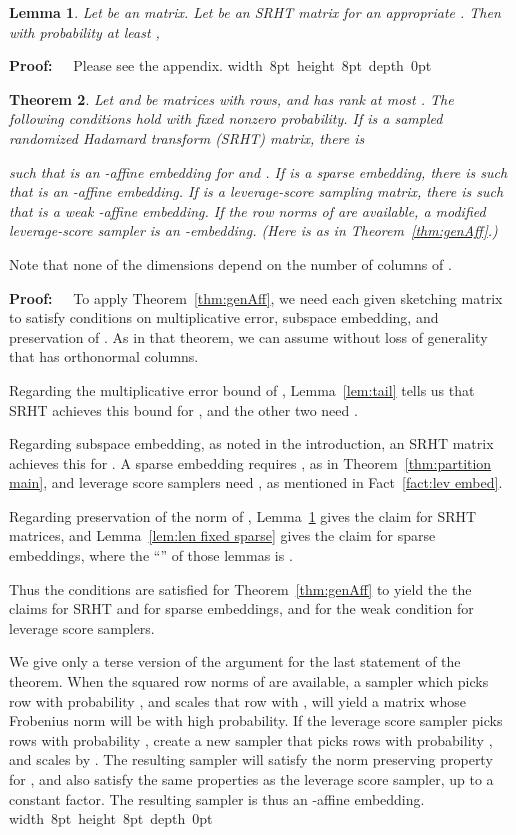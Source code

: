 \documentclass{sig-alternate}
\newtheorem{theorem}{Theorem}
\newtheorem{lemma}[theorem]{Lemma}
\def\FullBox{\hbox{\vrule width 8pt height 8pt depth 0pt}}
\def\qed{\ifmmode\qquad\FullBox\else{\unskip\nobreak\hfil
\penalty50\hskip1em\null\nobreak\hfil\FullBox
\parfillskip=0pt\finalhyphendemerits=0\endgraf}\fi}
\newenvironment{proof}{\begin{trivlist} \item {\bf Proof:~~}}
  {\qed\end{trivlist}}
\begin{document}
\begin{lemma}\label{lem:len fixed srht}
Let  be an  matrix. Let  be an
SRHT matrix for an appropriate . 
Then with probability at least ,

\end{lemma}
\begin{proof}
Please see the appendix.
\end{proof}


\begin{theorem}\label{thm:genAff res}
Let  and  be matrices with  rows, and  has rank
at most .
The following conditions hold with fixed nonzero
probability.
If  is a  sampled randomized Hadamard transform (SRHT) matrix, there is

such that  is an -affine embedding for  and . If  is a 
sparse embedding, there is 
such that  is an -affine embedding.
If  is a  leverage-score sampling matrix, there is 
such that  is a weak
-affine embedding. If the row norms of  are available,
a modified leverage-score sampler is an -embedding. (Here 
is as in Theorem~\ref{thm:genAff}.)
\end{theorem}

Note that none of the dimensions  depend on the number of columns of .

\begin{proof}
To apply Theorem~\ref{thm:genAff}, we need each given sketching matrix
to satisfy conditions on multiplicative error, subspace embedding, and
preservation of . As in that theorem, we can
assume without loss of generality that  has  orthonormal columns.

Regarding the multiplicative error bound of ,
Lemma~\ref{lem:tail} tells us that SRHT achieves this bound for ,
and the other two need .

Regarding subspace embedding, as noted in the introduction,
an SRHT matrix achieves this
for .
A sparse embedding requires ,
as in Theorem~\ref{thm:partition main}, and leverage score samplers
need , as mentioned in Fact~\ref{fact:lev embed}.

Regarding preservation of the norm of , Lemma~\ref{lem:len fixed srht}
gives the claim for SRHT matrices, and Lemma~\ref{lem:len fixed sparse} gives the claim for
sparse embeddings, where the ``'' of those lemmas
is .


Thus the conditions are satisfied for Theorem~\ref{thm:genAff}
to yield the the claims for SRHT and for sparse embeddings, and for the weak condition
for leverage score samplers.

We give only a terse version of the argument for the last statement of
the theorem.
When the squared row norms  of  are available,
a sampler which picks row  with probability ,
and scales that row with , will yield a matrix whose
Frobenius norm will be  with high probability.
If the leverage score sampler picks rows with probability ,
create a new sampler that picks rows with probability ,
and scales by . The resulting sampler will satisfy
the norm preserving property for , and also
satisfy the same properties as the leverage score sampler, up to a constant
factor. The resulting sampler is thus an -affine embedding.
\end{proof}
\end{document}
